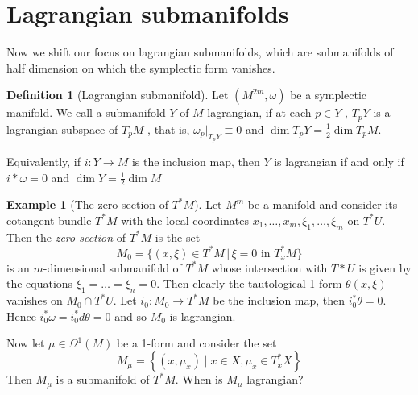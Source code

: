 \documentclass{article}
\numberwithin{theorem}{section}
\theoremstyle{definition}
\newtheorem{definition}[theorem]{Definition}
\newtheorem{example}[theorem]{Example}
\begin{document}
\section{Lagrangian submanifolds}

Now we shift our focus on lagrangian submanifolds, which are submanifolds of half dimension on which the symplectic form vanishes.

\begin{definition}[Lagrangian submanifold]
    Let $(M^{2m},\omega)$ be a symplectic manifold. We call a submanifold $Y$ of $M$ lagrangian, if at each $p \in Y$ , $T_pY$ is a lagrangian
    subspace of $T_pM$ , that is, $\omega_p|_{T_pY} \equiv 0$ and $\operatorname{dim} T_pY = \frac{1}{2} \operatorname{dim} T_pM$.

    Equivalently, if $i : Y \rightarrow M$ is the inclusion map, then $Y$ is lagrangian if and only if $i*\omega = 0$ and $\operatorname{dim} Y = \frac{1}{2} \operatorname{dim} M$ 
    
\end{definition}

\begin{example}[The zero section of $T^*M$]
    Let $M^m$ be a manifold and consider its cotangent bundle $T^*M$ with the local coordinates $x_1, \ldots, x_m, \xi_1, \ldots, \xi_m$ on $T^*U$. Then the \textit{zero section} of $T^*M$ is the set 
    \begin{equation*}
        M_0 = \{(x,\xi) \in T^*M\, |\, \xi = 0  \text{ in } T^*_xM\}
    \end{equation*}
    is an $m$-dimensional submanifold of $T^*M$ whose intersection with $T*U$ is given by the equations $\xi_1 = \ldots = \xi_n = 0$. Then clearly the tautological 1-form $\theta(x, \xi)$ vanishes on $M_0 \cap T^*U$. Let $i_0 : M_0 \rightarrow T^*M$ be the inclusion map, then $i_0^* \theta = 0$. Hence $i_0^* \omega = i_0^*d \theta = 0$ and so $M_0$ is lagrangian.
\end{example}

Now let $\mu \in \Omega^1(M)$ be a 1-form and consider the set 
\begin{equation}\label{eqNejakySubmanifold}
    M_\mu=\left\{\left(x, \mu_x\right) \mid x \in X, \mu_x \in T_x^* X\right\}
\end{equation}
Then $M_\mu$ is a submanifold of $T^*M$. When is $M_\mu$ lagrangian?
\end{document}
